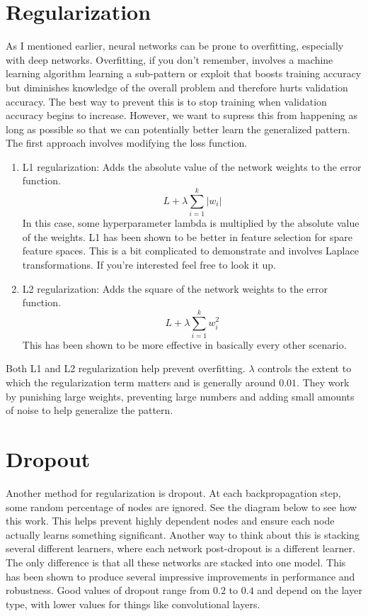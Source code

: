 \documentclass{article}
\begin{document}
\section{Regularization}
    As I mentioned earlier, neural networks can be prone to overfitting, especially with deep networks. Overfitting, if you don't remember, involves a machine learning algorithm learning a sub-pattern or exploit that boosts training accuracy but diminishes knowledge of the overall problem and therefore hurts validation accuracy. The best way to prevent this is to stop training when validation accuracy begins to increase. However, we want to supress this from happening as long as possible so that we can potentially better learn the generalized pattern. The first approach involves modifying the loss function.
    \begin{enumerate}
        \item L1 regularization: Adds the absolute value of the network weights to the error function. $$L + \lambda \sum_{i=1}^{k}|w_i|$$ In this case, some hyperparameter lambda is multiplied by the absolute value of the weights. L1 has been shown to be better in feature selection for spare feature spaces. This is a bit complicated to demonstrate and involves Laplace transformations. If you're interested feel free to look it up. 
        \item L2 regularization: Adds the square of the network weights to the error function. $$L + \lambda \sum_{i=1}^{k}w_i^2$$ This has been shown to be more effective in basically every other scenario.
    \end{enumerate}
    Both L1 and L2 regularization help prevent overfitting. $\lambda$ controls the extent to which the regularization term matters and is generally around $0.01$. They work by punishing large weights, preventing large numbers and adding small amounts of noise to help generalize the pattern.
    
\section{Dropout}
    Another method for regularization is dropout. At each backpropagation step, some random percentage of nodes are ignored. See the diagram below to see how this work. This helps prevent highly dependent nodes and ensure each node actually learns something significant. Another way to think about this is stacking several different learners, where each network post-dropout is a different learner. The only difference is that all these networks are stacked into one model. This has been shown to produce several impressive improvements in performance and robustness. Good values of dropout range from $0.2$ to $0.4$ and depend on the layer type, with lower values for things like convolutional layers.
    
\end{document}
